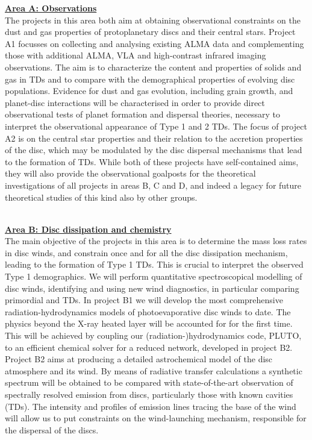 \documentclass[10pt,fleqn,twoside]{article}
\newcommand{\AreacolA}{\color{blue}}
\newcommand{\AreacolB}{\color{Green}}
\begin{document}
\noindent\underline{{\bf\AreacolA Area A: Observations}}\\
\noindent The projects in this area both aim at obtaining
observational constraints on the dust and gas properties of
protoplanetary discs and their central stars. Project A1 focusses on
collecting and analysing existing ALMA data and complementing those
with additional ALMA, VLA and high-contrast infrared imaging observations. 
The aim is to characterize the content and properties of solids and gas in TDs 
and to compare with the demographical properties of evolving disc populations. 
Evidence for dust and gas evolution, including grain growth,
and planet-disc interactions will be characterised in order to provide
direct observational tests of planet formation and dispersal theories,
necessary to interpret the observational appearance of Type 1 and 2
TDs. The focus of project A2 is on the central star properties and
their relation to the accretion properties of the disc, which may be
modulated by the disc dispersal mechanisms that lead to the formation
of TDs. While both of these projects have self-contained aims, they
will also provide the observational goalposts for the theoretical
investigations of all projects in areas B, C and D, and indeed a
legacy for future theoretical studies of this kind also by other
groups.  

%



\
\mbox{}\vspace{1em}\\
\noindent\underline{\bf\AreacolB Area B: Disc dissipation and chemistry }\\
\noindent The main objective of the projects in this area is to
determine the mass loss rates in disc winds, and constrain once and
for all the disc dissipation mechanism, leading to the formation of
Type 1 TDs. This is crucial to interpret the observed Type 1
demographics. We will perform quantitative spectroscopical modelling
of disc winds, identifying and using new wind diagnostics, in
particular comparing primordial and TDs. In project B1 we will develop
the most comprehensive radiation-hydrodynamics models of
photoevaporative disc winds to date. The physics beyond the X-ray
heated layer will be accounted for for the first time. This will be
achieved by coupling our  (radiation-)hydrodynamics code, PLUTO, to an efficient 
chemical solver for a reduced network,
developed in project B2. Project B2 aims at producing a detailed astrochemical model of the
disc atmosphere and its wind. By means of radiative transfer
calculations a synthetic spectrum will be obtained to be compared with
state-of-the-art observation of spectrally resolved emission from
discs, particularly those with known cavities (TDs). The intensity and
profiles of emission lines tracing the base of the wind will allow us
to put constraints on the wind-launching mechanism, responsible for
the dispersal of the discs.  
\end{document}
